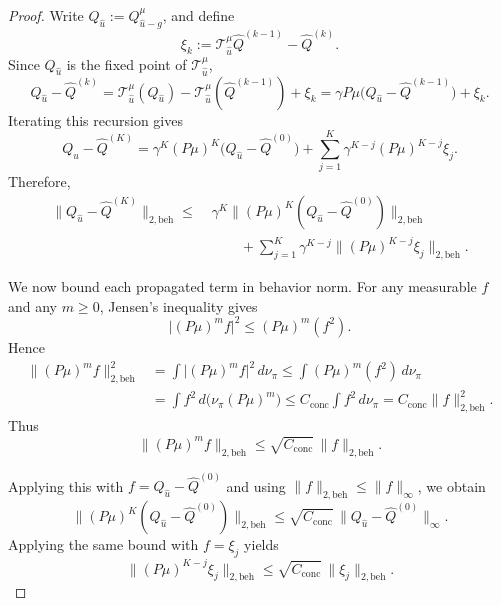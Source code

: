 \documentclass{article}
\newcommand{\1}{\mathbbm{1}}
\begin{document}
\begin{proof}
Write \(Q_{\hat u}:=Q^\mu_{\hat u-g}\), and define
\[
\xi_k
:=
\mathcal T^\mu_{\hat u}\hat Q^{(k-1)}-\hat Q^{(k)}.
\]
Since \(Q_{\hat u}\) is the fixed point of \(\mathcal T^\mu_{\hat u}\),
\[
Q_{\hat u}-\hat Q^{(k)}
=
\mathcal T^\mu_{\hat u}(Q_{\hat u})
-\mathcal T^\mu_{\hat u}(\hat Q^{(k-1)})
+\xi_k
=
\gamma P\mu\bigl(Q_{\hat u}-\hat Q^{(k-1)}\bigr)+\xi_k.
\]
Iterating this recursion gives
\[
Q_{\hat u}-\hat Q^{(K)}
=
\gamma^K (P\mu)^K\bigl(Q_{\hat u}-\hat Q^{(0)}\bigr)
+
\sum_{j=1}^K \gamma^{K-j}(P\mu)^{K-j}\xi_j.
\]
Therefore,
\begin{align*}
\|Q_{\hat u}-\hat Q^{(K)}\|_{2,\mathrm{beh}}
\le\;&
\gamma^K
\|(P\mu)^K(Q_{\hat u}-\hat Q^{(0)})\|_{2,\mathrm{beh}}
\\
&\qquad+
\sum_{j=1}^K
\gamma^{K-j}
\|(P\mu)^{K-j}\xi_j\|_{2,\mathrm{beh}}.
\end{align*}

We now bound each propagated term in behavior norm. For any measurable
\(f\) and any \(m\ge 0\), Jensen's inequality gives
\[
\bigl|(P\mu)^m f\bigr|^2
\le
(P\mu)^m(f^2).
\]
Hence
\begin{align*}
\|(P\mu)^m f\|_{2,\mathrm{beh}}^2
&=
\int \bigl|(P\mu)^m f\bigr|^2\,d\nu_\pi
\le
\int (P\mu)^m(f^2)\,d\nu_\pi
\\
&=
\int f^2\,d\bigl(\nu_\pi (P\mu)^m\bigr)
\le
C_{\mathrm{conc}}\int f^2\,d\nu_\pi
=
C_{\mathrm{conc}}\|f\|_{2,\mathrm{beh}}^2.
\end{align*}
Thus
\[
\|(P\mu)^m f\|_{2,\mathrm{beh}}
\le
\sqrt{C_{\mathrm{conc}}}\,\|f\|_{2,\mathrm{beh}}.
\]

Applying this with \(f=Q_{\hat u}-\hat Q^{(0)}\) and using
\(\|f\|_{2,\mathrm{beh}}\le \|f\|_\infty\), we obtain
\[
\|(P\mu)^K(Q_{\hat u}-\hat Q^{(0)})\|_{2,\mathrm{beh}}
\le
\sqrt{C_{\mathrm{conc}}}\,
\|Q_{\hat u}-\hat Q^{(0)}\|_\infty.
\]
Applying the same bound with \(f=\xi_j\) yields
\[
\|(P\mu)^{K-j}\xi_j\|_{2,\mathrm{beh}}
\le
\sqrt{C_{\mathrm{conc}}}\,\|\xi_j\|_{2,\mathrm{beh}}.
\]


\end{proof}
\end{document}
